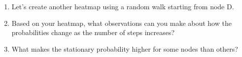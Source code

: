 \documentclass[a4paper, 14pt]{extarticle}
\begin{document}
\begin{enumerate}[resume]
\item Let's create another heatmap using a random walk starting from node D.

\vspace{3cm}

\item Based on your heatmap, what observations can you make about how the probabilities change as the number of steps increases?

\vspace{3cm}

\item What makes the stationary probability higher for some nodes than others?

\vspace{3cm}

\end{enumerate}
\end{document}
